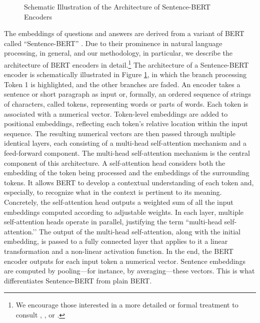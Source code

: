 {{\begin{figure}[!tbp]
{}
    \caption{Schematic Illustration of the Architecture of Sentence-BERT Encoders}
    \label{fig:BERT}
\end{figure}

The embeddings of questions and answers are derived from a variant of BERT called ``Sentence-BERT'' \citep{devlin-etal-2019-bert, reimers2019sentencebert}. Due to their prominence in natural language processing, in general, and our methodology, in particular, we describe the architecture of BERT encoders in detail.\footnote{We encourage those interested in a more detailed or formal treatment to consult \citet{learning_deep_learning}, \citet{pml1Book}, or \citet{zhang2023dive}.} The architecture of a Sentence-BERT encoder is schematically illustrated in Figure \ref{fig:BERT}, in which the branch processing Token 1 is highlighted, and the other branches are faded. An encoder takes a sentence or short paragraph as input or, formally, an ordered sequence of strings of characters, called tokens, representing words or parts of words. Each token is associated with a numerical vector. Token-level embeddings are added to positional embeddings, reflecting each token’s relative location within the input sequence. The resulting numerical vectors are then passed through multiple identical layers, each consisting of a multi-head self-attention mechanism and a feed-forward component. The multi-head self-attention mechanism is the central component of this architecture. A self-attention head considers both the embedding of the token being processed and the embeddings of the surrounding tokens. It allows BERT to develop a contextual understanding of each token and, especially, to recognize what in the context is pertinent to its meaning. Concretely, the self-attention head outputs a weighted sum of all the input embeddings computed according to adjustable weights. In each layer, multiple self-attention heads operate in parallel, justifying the term ``multi-head self-attention.’’ The output of the multi-head self-attention, along with the initial embedding, is passed to a fully connected layer that applies to it a linear transformation and a non-linear activation function. In the end, the BERT encoder outputs for each input token a numerical vector. Sentence embeddings are computed by pooling---for instance, by averaging---these vectors. This is what differentiates Sentence-BERT from plain BERT.

}}
